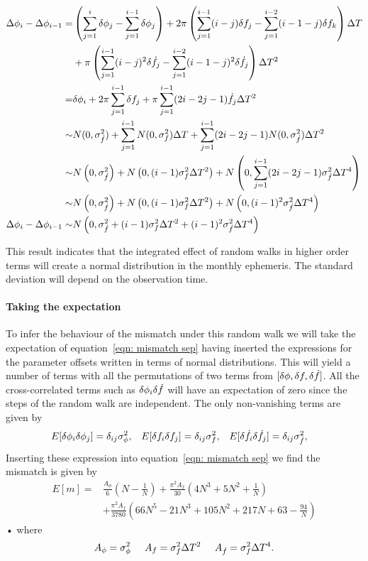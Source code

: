 \begin{align}
\Delta \phi_{i} - \Delta \phi_{i-1} = &  \left(\sum_{j=1}^{i}\delta \phi_{j} 
-  \sum_{j=1}^{i-1}\delta \phi_{j}\right) + 2\pi\left(\sum_{j=1}^{i-1}(i-j)\delta f_{j}  
-  \sum_{j=1}^{i-2}(i-1-j)\delta f_{k} \right)\Delta T \notag \\
& + \pi\left(\sum_{j=1}^{i-1}(i-j)^{2}\delta \dot{f}_{j} 
- \sum_{j=1}^{i-2}(i-1-j)^{2}\delta \dot{f}_{j}\right)\Delta T^{2} \\
= &  \delta \phi_{i} +  2\pi \sum_{j=1}^{i-1}\delta f_{j} 
+ \pi \sum_{j=1}^{i-1}(2i - 2j -1)\dot{f}_{j}\Delta T^{2} \\
\sim &  N(0, \sigma_{\dot{f}}^{2}) + \sum_{j=1}^{i-1}N(0, \sigma_{f}^{2}) \Delta T 
+ \sum_{j=1}^{i-1}(2i - 2j -1)N(0, \sigma_{\dot{f}}^{2}) \Delta T^{2}  \\
\sim &  N\left(0, \sigma_{\dot{f}}^{2}\right) + N\left(0, (i-1)\sigma_{f}^{2}\Delta T^{2}\right) 
+ N\left(0, \sum_{j=1}^{i-1}(2i - 2j -1)\sigma_{\dot{f}}^{2}\Delta T^{4}\right)  \\
\sim &  N\left(0, \sigma_{\dot{f}}^{2}\right) + N\left(0, (i-1)\sigma_{f}^{2}\Delta T^{2}\right) 
+ N\left(0, (i-1)^{2}\sigma_{\dot{f}}^{2}\Delta T^{4}\right)  \\
\Delta \phi_{i} - \Delta \phi_{i-1}  \sim & N\left(0, \sigma_{\dot{f}}^{2} 
+ (i-1)\sigma_{f}^{2}\Delta T^{2} + (i-1)^{2}\sigma_{\dot{f}}^{2}\Delta T^{4}\right)
\end{align}

This result indicates that the integrated effect of random walks in higher
order terms will create a normal distribution in the monthly ephemeris. The
standard deviation will
depend on the observation time. 

\paragraph{Taking the expectation}
To infer the behaviour of the mismatch under this random walk we will take the
expectation of equation~\eqref{eqn: mismatch sep} having inserted the
expressions for the parameter offsets written in terms of normal distributions.
This will yield a number of terms with all the permutations of two terms from
$[\delta \phi, \delta f, \delta \dot{f}]$. All the cross-correlated terms such as
$\delta\phi_{i}\delta \dot{f}$ will have an expectation of zero since the steps of the
random walk are independent. The only non-vanishing terms are given by
\begin{align}
E[\delta\phi_{i}\delta\phi_{j}] &= \delta_{ij}\sigma_{\phi}^{2}, & 
E[\delta f_{i}\delta f_{j}] &= \delta_{ij}\sigma_{f}^{2},& 
E[\delta\dot{f}_{i}\delta\dot{f}_{j}] &= \delta_{ij}\sigma_{\dot{f}}^{2}, 
\end{align}
Inserting these expression into equation~\eqref{eqn: mismatch sep} 
we find the mismatch is given by
\begin{align}
E[m]   = &  \frac{A_{\phi}}{6} \left(N - \frac{1}{N}\right) 
+ \frac{\pi^{2} A_{{f}}}{30}\left(4 N^{3} + 5 N^{2} + \frac{1}{N}\right)\\
 & +  \frac{\pi^{2} A_{{\dot{f}}}}{3780} \left(66 N^{5} - 21 N^{3} + 105 N^{2} 
 + 217 N + 63 - \frac{94}{N}\right)
\label{eqn: expectation}
\end{align}•
where 
\begin{equation}
	A_{\phi} = \sigma_{\phi}^{2} \;\;\;\;\; 
    A_{f} = \sigma_{f}^{2}\Delta T^{2} \;\;\;\;\; 
    A_{\dot{f}} = \sigma_{f}^{2}\Delta T^{4}.
\end{equation}

